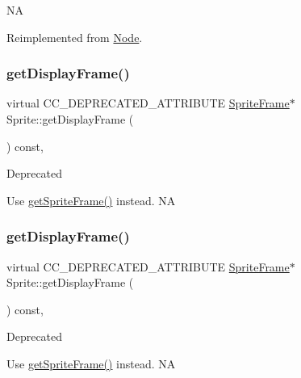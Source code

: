 NA 

Reimplemented from \hyperlink{classNode_a41710375a0d92a4ee54c39fe123b5912}{Node}.

\mbox{\label{classSprite_a397ae5a00212e31172695b8faa4aff4e}} 
\subsubsection{\texorpdfstring{get\+Display\+Frame()}{getDisplayFrame()}\hspace{0.1cm}{\footnotesize\ttfamily [1/2]}}
{\footnotesize\ttfamily virtual C\+C\+\_\+\+D\+E\+P\+R\+E\+C\+A\+T\+E\+D\+\_\+\+A\+T\+T\+R\+I\+B\+U\+TE \hyperlink{classSpriteFrame}{Sprite\+Frame}$\ast$ Sprite\+::get\+Display\+Frame (\begin{DoxyParamCaption}{ }\end{DoxyParamCaption}) const\hspace{0.3cm}{\ttfamily [inline]}, {\ttfamily [virtual]}}

\begin{DoxyRefDesc}{Deprecated}
\item[\hyperlink{deprecated__deprecated000038}{Deprecated}]Use {\ttfamily \hyperlink{classSprite_abdda1faf423bfcb61dd253399247626c}{get\+Sprite\+Frame()}} instead.  NA \end{DoxyRefDesc}
\mbox{\label{classSprite_a397ae5a00212e31172695b8faa4aff4e}} 
\subsubsection{\texorpdfstring{get\+Display\+Frame()}{getDisplayFrame()}\hspace{0.1cm}{\footnotesize\ttfamily [2/2]}}
{\footnotesize\ttfamily virtual C\+C\+\_\+\+D\+E\+P\+R\+E\+C\+A\+T\+E\+D\+\_\+\+A\+T\+T\+R\+I\+B\+U\+TE \hyperlink{classSpriteFrame}{Sprite\+Frame}$\ast$ Sprite\+::get\+Display\+Frame (\begin{DoxyParamCaption}{ }\end{DoxyParamCaption}) const\hspace{0.3cm}{\ttfamily [inline]}, {\ttfamily [virtual]}}

\begin{DoxyRefDesc}{Deprecated}
\item[\hyperlink{deprecated__deprecated000268}{Deprecated}]Use {\ttfamily \hyperlink{classSprite_abdda1faf423bfcb61dd253399247626c}{get\+Sprite\+Frame()}} instead.  NA \end{DoxyRefDesc}
\mbox{\label{classSprite_a783cd2206e8da661869af7a49ad41d7c}} 
